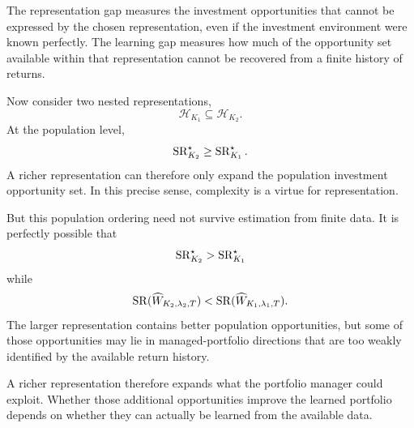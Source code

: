 The representation gap measures the investment opportunities that cannot be
expressed by the chosen representation, even if the investment environment
were known perfectly. The learning gap measures how much of the opportunity
set available within that representation cannot be recovered from a finite
history of returns.

Now consider two nested representations,
\[
\mathcal H_{K_1}\subseteq\mathcal H_{K_2}.
\]
At the population level,
\[
\operatorname{SR}_{K_2}^\star\geq\operatorname{SR}_{K_1}^\star.
\]
A richer representation can therefore only expand the population investment
opportunity set. In this precise sense, complexity is a virtue for
representation.

But this population ordering need not survive estimation from finite data. It
is perfectly possible that
\[
\operatorname{SR}_{K_2}^\star>\operatorname{SR}_{K_1}^\star
\]
while
\[
\operatorname{SR}(\widehat W_{K_2,\lambda_2,T})
<
\operatorname{SR}(\widehat W_{K_1,\lambda_1,T}).
\]
The larger representation contains better population opportunities, but some
of those opportunities may lie in managed-portfolio directions that are too
weakly identified by the available return history.

A richer representation therefore expands what the portfolio manager could
exploit. Whether those additional opportunities improve the learned portfolio
depends on whether they can actually be learned from the available data.